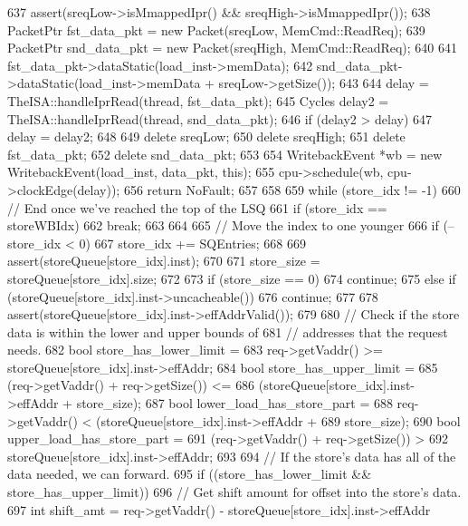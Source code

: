 \begin{DoxyCode}
{{{637             assert(sreqLow->isMmappedIpr() && sreqHigh->isMmappedIpr());
638             PacketPtr fst_data_pkt = new Packet(sreqLow, MemCmd::ReadReq);
639             PacketPtr snd_data_pkt = new Packet(sreqHigh, MemCmd::ReadReq);
640 
641             fst_data_pkt->dataStatic(load_inst->memData);
642             snd_data_pkt->dataStatic(load_inst->memData + sreqLow->getSize());
643 
644             delay = TheISA::handleIprRead(thread, fst_data_pkt);
645             Cycles delay2 = TheISA::handleIprRead(thread, snd_data_pkt);
646             if (delay2 > delay)
647                 delay = delay2;
648 
649             delete sreqLow;
650             delete sreqHigh;
651             delete fst_data_pkt;
652             delete snd_data_pkt;
653         }
654         WritebackEvent *wb = new WritebackEvent(load_inst, data_pkt, this);
655         cpu->schedule(wb, cpu->clockEdge(delay));
656         return NoFault;
657     }
658 
659     while (store_idx != -1) {
660         // End once we've reached the top of the LSQ
661         if (store_idx == storeWBIdx) {
662             break;
663         }
664 
665         // Move the index to one younger
666         if (--store_idx < 0)
667             store_idx += SQEntries;
668 
669         assert(storeQueue[store_idx].inst);
670 
671         store_size = storeQueue[store_idx].size;
672 
673         if (store_size == 0)
674             continue;
675         else if (storeQueue[store_idx].inst->uncacheable())
676             continue;
677 
678         assert(storeQueue[store_idx].inst->effAddrValid());
679 
680         // Check if the store data is within the lower and upper bounds of
681         // addresses that the request needs.
682         bool store_has_lower_limit =
683             req->getVaddr() >= storeQueue[store_idx].inst->effAddr;
684         bool store_has_upper_limit =
685             (req->getVaddr() + req->getSize()) <=
686             (storeQueue[store_idx].inst->effAddr + store_size);
687         bool lower_load_has_store_part =
688             req->getVaddr() < (storeQueue[store_idx].inst->effAddr +
689                            store_size);
690         bool upper_load_has_store_part =
691             (req->getVaddr() + req->getSize()) >
692             storeQueue[store_idx].inst->effAddr;
693 
694         // If the store's data has all of the data needed, we can forward.
695         if ((store_has_lower_limit && store_has_upper_limit)) {
696             // Get shift amount for offset into the store's data.
697             int shift_amt = req->getVaddr() - storeQueue[store_idx].inst->effAddr
}}}
\end{DoxyCode}
